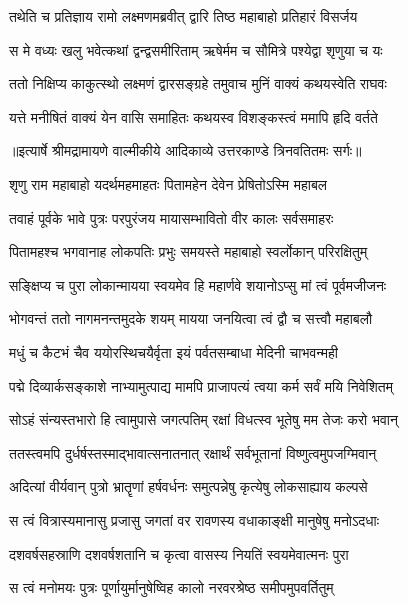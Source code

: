 \twolineshloka
{तथेति च प्रतिज्ञाय रामो लक्ष्मणमब्रवीत्}
{द्वारि तिष्ठ महाबाहो प्रतिहारं विसर्जय} %

\twolineshloka
{स मे वध्यः खलु भवेत्कथां द्वन्द्वसमीरिताम्}
{ऋषेर्मम च सौमित्रे पश्येद्वा शृणुया च यः} %

\twolineshloka
{ततो निक्षिप्य काकुत्स्थो लक्ष्मणं द्वारसङ्ग्रहे}
{तमुवाच मुनिं वाक्यं कथयस्वेति राघवः} %

\twolineshloka
{यत्ते मनीषितं वाक्यं येन वासि समाहितः}
{कथयस्व विशङ्कस्त्वं ममापि हृदि वर्तते} %


{॥इत्यार्षे श्रीमद्रामायणे वाल्मीकीये आदिकाव्ये उत्तरकाण्डे त्रिनवतितमः सर्गः॥}


\twolineshloka
{शृणु राम महाबाहो यदर्थमहमाहतः}
{पितामहेन देवेन प्रेषितोऽस्मि महाबल} %

\twolineshloka
{तवाहं पूर्वके भावे पुत्रः परपुरंजय}
{मायासम्भावितो वीर कालः सर्वसमाहरः} %

\twolineshloka
{पितामहश्च भगवानाह लोकपतिः प्रभुः}
{समयस्ते महाबाहो स्वर्लोकान् परिरक्षितुम्} %

\twolineshloka
{सङ्क्षिप्य च पुरा लोकान्मायया स्वयमेव हि}
{महार्णवे शयानोऽप्सु मां त्वं पूर्वमजीजनः} %

\twolineshloka
{भोगवन्तं ततो नागमनन्तमुदके शयम्}
{मायया जनयित्वा त्वं द्वौ च सत्त्वौ महाबलौ} %

\twolineshloka
{मधुं च कैटभं चैव ययोरस्थिचयैर्वृता}
{इयं पर्वतसम्बाधा मेदिनी चाभवन्मही} %

\twolineshloka
{पद्मे दिव्यार्कसङ्काशे नाभ्यामुत्पाद्य मामपि}
{प्राजापत्यं त्वया कर्म सर्वं मयि निवेशितम्} %

\twolineshloka
{सोऽहं संन्यस्तभारो हि त्वामुपासे जगत्पतिम्}
{रक्षां विधत्स्व भूतेषु मम तेजः करो भवान्} %

\twolineshloka
{ततस्त्वमपि दुर्धर्षस्तस्माद्भावात्सनातनात्}
{रक्षार्थं सर्वभूतानां विष्णुत्वमुपजग्मिवान्} %

\twolineshloka
{अदित्यां वीर्यवान् पुत्रो भ्रातॄणां हर्षवर्धनः}
{समुत्पन्नेषु कृत्येषु लोकसाह्याय कल्पसे} %

\twolineshloka
{स त्वं वित्रास्यमानासु प्रजासु जगतां वर}
{रावणस्य वधाकाङ्क्षी मानुषेषु मनोऽदधाः} %

\twolineshloka
{दशवर्षसहस्राणि दशवर्षशतानि च}
{कृत्वा वासस्य नियतिं स्वयमेवात्मनः पुरा} %

\twolineshloka
{स त्वं मनोमयः पुत्रः पूर्णायुर्मानुषेष्विह}
{कालो नरवरश्रेष्ठ समीपमुपवर्तितुम्} %

